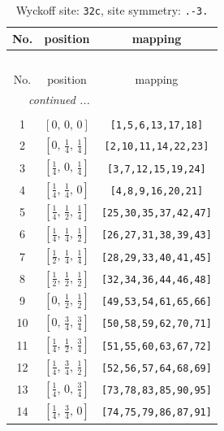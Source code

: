 \documentclass[fleqn,8pt]{jsarticle}
\begin{document}
\begin{longtable}{ccc}
\caption{Wyckoff site: {\tt 32c}, site symmetry: {\tt .-3.}}
 \\
 \hline \hline
No. & position & mapping \\ \hline \endfirsthead

\multicolumn{2}{l}{\tablename\ \thetable{}} \\
 \hline \hline
No. & position & mapping \\ \hline \endhead

 \hline \hline
\multicolumn{2}{r}{\footnotesize\it continued ...} \\ \endfoot

 \hline \hline
\multicolumn{2}{r}{} \\ \endlastfoot

1 & $\left[ 0,\, 0,\, 0 \right]$ & {\tt [1,5,6,13,17,18]} \\ \hline
2 & $\left[ 0,\, \frac{1}{4},\, \frac{1}{4} \right]$ & {\tt [2,10,11,14,22,23]} \\ \hline
3 & $\left[ \frac{1}{4},\, 0,\, \frac{1}{4} \right]$ & {\tt [3,7,12,15,19,24]} \\ \hline
4 & $\left[ \frac{1}{4},\, \frac{1}{4},\, 0 \right]$ & {\tt [4,8,9,16,20,21]} \\ \hline
5 & $\left[ \frac{1}{4},\, \frac{1}{2},\, \frac{1}{4} \right]$ & {\tt [25,30,35,37,42,47]} \\ \hline
6 & $\left[ \frac{1}{4},\, \frac{1}{4},\, \frac{1}{2} \right]$ & {\tt [26,27,31,38,39,43]} \\ \hline
7 & $\left[ \frac{1}{2},\, \frac{1}{4},\, \frac{1}{4} \right]$ & {\tt [28,29,33,40,41,45]} \\ \hline
8 & $\left[ \frac{1}{2},\, \frac{1}{2},\, \frac{1}{2} \right]$ & {\tt [32,34,36,44,46,48]} \\ \hline
9 & $\left[ 0,\, \frac{1}{2},\, \frac{1}{2} \right]$ & {\tt [49,53,54,61,65,66]} \\ \hline
10 & $\left[ 0,\, \frac{3}{4},\, \frac{3}{4} \right]$ & {\tt [50,58,59,62,70,71]} \\ \hline
11 & $\left[ \frac{1}{4},\, \frac{1}{2},\, \frac{3}{4} \right]$ & {\tt [51,55,60,63,67,72]} \\ \hline
12 & $\left[ \frac{1}{4},\, \frac{3}{4},\, \frac{1}{2} \right]$ & {\tt [52,56,57,64,68,69]} \\ \hline
13 & $\left[ \frac{1}{4},\, 0,\, \frac{3}{4} \right]$ & {\tt [73,78,83,85,90,95]} \\ \hline
14 & $\left[ \frac{1}{4},\, \frac{3}{4},\, 0 \right]$ & {\tt [74,75,79,86,87,91]} \\ \hline

\end{longtable}
\end{document}
